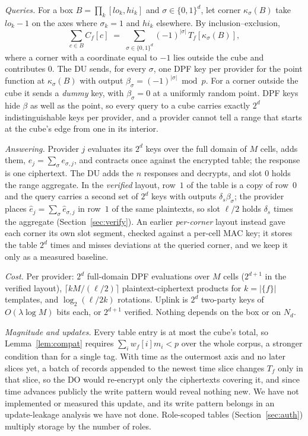 \documentclass[a4paper,fleqn]{cas-sc}
\begin{document}
\emph{Queries.} For a box $B=\prod_k[\mathit{lo}_k,\mathit{hi}_k]$ and
$\sigma\in\{0,1\}^d$, let corner $\kappa_\sigma(B)$ take $\mathit{lo}_k-1$ on
the axes where $\sigma_k=1$ and $\mathit{hi}_k$ elsewhere. By
inclusion--exclusion,
\begin{equation}
\label{eq:ie}
\sum_{c\in B} C_f[c] \;=\; \sum_{\sigma\in\{0,1\}^d} (-1)^{|\sigma|}\,
T_f[\kappa_\sigma(B)],
\end{equation}
where a corner with a coordinate equal to $-1$ lies outside the cube and
contributes $0$. The DU sends, for every $\sigma$, one DPF key per provider
for the point function at $\kappa_\sigma(B)$ with output
$\beta_\sigma=(-1)^{|\sigma|}\bmod p$. For a corner outside the cube it sends a
\emph{dummy} key, with $\beta_\sigma=0$ at a uniformly random point. DPF keys
hide $\beta$ as well as the point, so every query to a cube carries exactly
$2^d$ indistinguishable keys per provider, and a provider cannot tell a range
that starts at the cube's edge from one in its interior.

\emph{Answering.} Provider $j$ evaluates its $2^d$ keys over the full domain of
$M$ cells, adds them, $e_j=\sum_\sigma e_{\sigma,j}$, and contracts once against
the encrypted table; the response is one ciphertext. The DU adds the $n$
responses and decrypts, and slot $0$ holds the range aggregate. In the
\emph{verified} layout, row~$1$ of the table is a copy of row~$0$ and the query
carries a second set of $2^d$ keys with outputs $\delta_s\beta_\sigma$; the
provider places $\hat e_j=\sum_\sigma\hat e_{\sigma,j}$ in row~$1$ of the same
plaintexts, so slot $\ell/2$ holds $\delta_s$ times the aggregate
(Section~\ref{sec:verify}). An earlier \emph{per-corner} layout instead gave
each corner its own slot segment, checked against a per-cell MAC key; it stores
the table $2^d$ times and misses deviations at the queried corner, and we keep
it only as a measured baseline.

\emph{Cost.} Per provider: $2^d$ full-domain DPF evaluations over $M$ cells
($2^{d+1}$ in the verified layout), $\lceil kM/(\ell/2)\rceil$
plaintext-ciphertext products for $k=|\{f\}|$ templates, and
$\log_2(\ell/2k)$ rotations. Uplink is $2^d$ two-party keys of
$O(\lambda\log M)$ bits each, or $2^{d+1}$ verified. Nothing depends on the box
or on $N_d$.

\emph{Magnitude and updates.} Every table entry is at most the cube's total,
so Lemma~\ref{lem:compat} requires $\sum_i w_f[i]m_i<p$ over the whole corpus,
a stronger condition than for a single tag. With time as the outermost axis
and no later slices yet, a batch of records appended to the newest time slice
changes $T_f$ only in that slice, so the DO would re-encrypt only the
ciphertexts covering it, and since time advances publicly the write pattern
would reveal nothing new. We have not implemented or measured this update, and
its write pattern belongs in an update-leakage analysis we have not done.
Role-scoped tables (Section~\ref{sec:auth}) multiply storage by the number of
roles.
\end{document}
